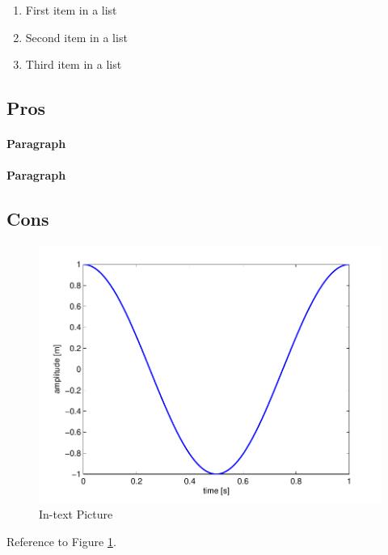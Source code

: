\documentclass[fleqn,10pt]{SelfArx} %
\begin{document}
\begin{enumerate}[noitemsep] %
\item First item in a list
\item Second item in a list
\item Third item in a list
\end{enumerate}

\subsection{Pros}


\paragraph{Paragraph} \lipsum[7] %
\paragraph{Paragraph} \lipsum[8] %

\subsection{Cons}

\lipsum[9] %

\begin{figure}[ht]\centering
\includegraphics[width=\linewidth]{results}
\caption{In-text Picture}
\label{fig:results}
\end{figure}

Reference to Figure \ref{fig:results}.
\end{document}
